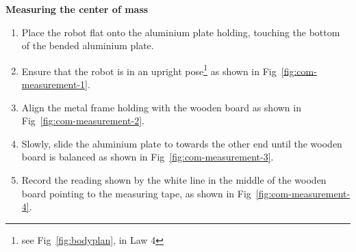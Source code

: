 {\bigskip

{\bfseries Measuring the center of mass}

\headlinebox

\begin{enumerate}
\item Place the robot flat onto the aluminium plate holding,
  touching the bottom of the bended aluminium plate.
\item Ensure that the robot is in an upright pose\footnote{see
    Fig~\ref{fig:bodyplan}, in Law 4}
  as shown in Fig~\ref{fig:com-measurement-1}.
\item Align the metal frame holding with the wooden board as shown in
  Fig~\ref{fig:com-measurement-2}.
\item Slowly, slide the aluminium plate to towards the other end until the
  wooden board is balanced as shown in Fig~\ref{fig:com-measurement-3}.
\item Record the reading shown by the white line in the middle of the wooden
  board pointing to the measuring tape,
  as shown in Fig~\ref{fig:com-measurement-4}.
\end{enumerate}

}
